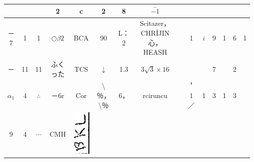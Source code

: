 \documentclass[10pt]{article}
\begin{document}
\begin{center}
\begin{tabular}{|c|c|c|c|c|c|c|c|c|c|c|c|c|c|c|}
 &  &  & 2 & c & 2 & 8 & \(\stackrel{-}{-1}\) \\
\hline
－7 & 1 & 1 & \(\bigcirc \beta 2\) & BCA & 90 & L： 2 & Scitazer，CHRİJIN心，HEASH &  & 1 & \(i\) & 9 & 1 & 6 & 1 \\
\hline
－ & 11 & 11 & ふくった & TCS & \(\downarrow\) & 1.3 & \(3 \sqrt{3} \times 16\) &  &  &  & 7 &  & 2 &  \\
\hline
\(\alpha_{1}\) & 4 & \(\therefore\) & －6r & Cor & \textbackslash ％，\textbackslash ％ & 6， & rciruncu &  & ＇1／ & 1 & 3 & 1 & 3 &  \\
\hline
9 & 4 & \(\cdots\) & CMH & \includegraphics[max width=\textwidth]{2025_02_27_dd68c3d38de88f0516d9g-009(6)}

\end{tabular}
\end{center}
\end{document}
